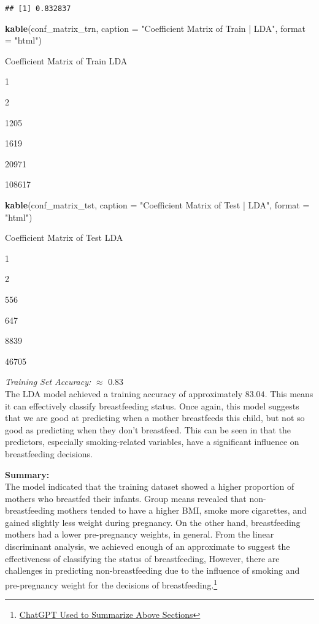 \documentclass[
]{article}
\newenvironment{Shaded}{\begin{snugshade}}{\end{snugshade}}
\newcommand{\AttributeTok}[1]{\textcolor[rgb]{0.13,0.29,0.53}{#1}}
\newcommand{\FunctionTok}[1]{\textcolor[rgb]{0.13,0.29,0.53}{\textbf{#1}}}
\newcommand{\NormalTok}[1]{#1}
\newcommand{\StringTok}[1]{\textcolor[rgb]{0.31,0.60,0.02}{#1}}
\begin{document}
\begin{verbatim}
## [1] 0.832837
\end{verbatim}

\begin{Shaded}
\begin{Highlighting}[]
\FunctionTok{kable}\NormalTok{(conf\_matrix\_trn, }\AttributeTok{caption =} \StringTok{"Coefficient Matrix of Train | LDA"}\NormalTok{, }\AttributeTok{format =} \StringTok{"html"}\NormalTok{)}
\end{Highlighting}
\end{Shaded}

Coefficient Matrix of Train \textbar{} LDA

1

2

1205

1619

20971

108617

\begin{Shaded}
\begin{Highlighting}[]
\FunctionTok{kable}\NormalTok{(conf\_matrix\_tst, }\AttributeTok{caption =} \StringTok{"Coefficient Matrix of Test  | LDA"}\NormalTok{, }\AttributeTok{format =} \StringTok{"html"}\NormalTok{)}
\end{Highlighting}
\end{Shaded}

Coefficient Matrix of Test \textbar{} LDA

1

2

556

647

8839

46705

\emph{Training Set Accuracy:} \(\approx\) 0.83\\
The LDA model achieved a training accuracy of approximately \(83.04%
\). This means it can effectively classify breastfeeding status. Once
again, this model suggests that we are good at predicting when a mother
breastfeeds this child, but not so good as predicting when they don't
breastfeed. This can be seen in that the predictors, especially
smoking-related variables, have a significant influence on breastfeeding
decisions.

\textbf{Summary:}\\
The model indicated that the training dataset showed a higher proportion
of mothers who breastfed their infants. Group means revealed that
non-breastfeeding mothers tended to have a higher BMI, smoke more
cigarettes, and gained slightly less weight during pregnancy. On the
other hand, breastfeeding mothers had a lower pre-pregnancy weights, in
general. From the linear discriminant analysis, we achieved enough of an
approximate to suggest the effectiveness of classifying the status of
breastfeeding, However, there are challenges in predicting
non-breastfeeding due to the influence of smoking and pre-pregnancy
weight for the decisions of breastfeeding.\footnote{\href{https://chatgpt.com/share/6713e2fa-743c-8011-b9b6-4ed452cc3b3a}{ChatGPT
  Used to Summarize Above Sections}}
\end{document}
